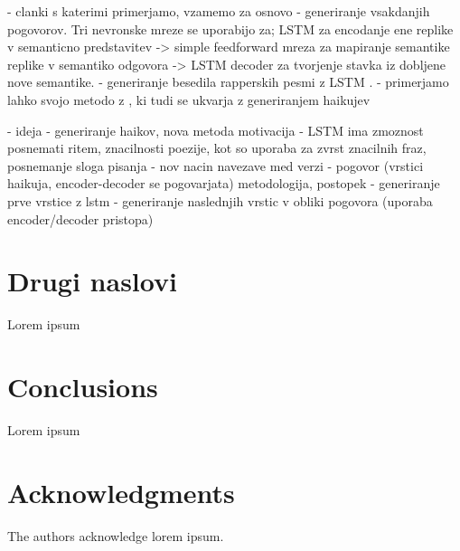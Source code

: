\documentclass{acm_proc_article-sp}
\begin{document}
- clanki s katerimi primerjamo, vzamemo za osnovo
       - generiranje vsakdanjih pogovorov. Tri nevronske mreze se uporabijo za; LSTM za encodanje ene replike v semanticno predstavitev -> simple feedforward mreza za mapiranje semantike replike v semantiko odgovora -> LSTM decoder za tvorjenje stavka iz dobljene nove semantike. \cite{luo2018autoencoder}
       - generiranje besedila rapperskih pesmi z LSTM \cite{potash2015ghostwriter}.
       - primerjamo lahko svojo metodo z \cite{netzer2009gaiku}, ki tudi se ukvarja z generiranjem haikujev

- ideja - generiranje haikov, nova metoda
motivacija
       - LSTM ima zmoznost posnemati ritem, znacilnosti poezije, kot so uporaba za zvrst znacilnih fraz, posnemanje sloga pisanja \cite{potash2015ghostwriter}
       - nov nacin navezave med verzi - pogovor (vrstici haikuja, encoder-decoder se pogovarjata)
metodologija, postopek
       - generiranje prve vrstice z lstm
       - generiranje naslednjih vrstic v obliki pogovora (uporaba encoder/decoder pristopa) %

\section{Drugi naslovi}

Lorem ipsum

\section{Conclusions}

Lorem ipsum

\section{Acknowledgments}

The authors acknowledge lorem ipsum.





\balancecolumns
\end{document}
